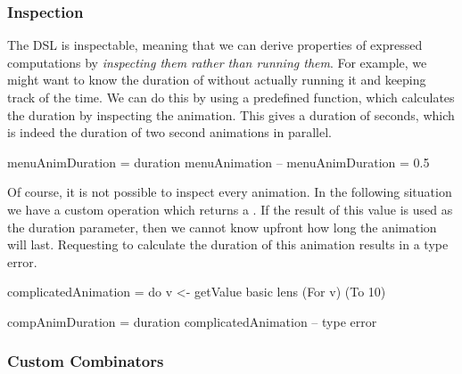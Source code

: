 


\subsubsection{Inspection}

The DSL is inspectable, meaning that we can derive properties of expressed computations by \emph{inspecting them rather than running them}. For example, we might want to know the duration of  without actually running it and keeping track of the time. We can do this by using a predefined  function, which calculates the duration by inspecting the animation. This gives a duration of  seconds, which is indeed the duration of two  second animations in parallel.

\begin{spec}
menuAnimDuration = duration menuAnimation
-- menuAnimDuration = 0.5 
\end{spec}

Of course, it is not possible to inspect every animation. In the following situation we have a custom operation  which returns a . If the result of this value is used as the duration parameter, then we cannot know upfront how long the animation will last. Requesting to calculate the duration of this animation results in a type error.

\begin{spec}
complicatedAnimation = do
  v <- getValue
  basic lens (For v) (To 10)

compAnimDuration = duration complicatedAnimation
-- type error
\end{spec}

\subsubsection{Custom Combinators}
\label{sec:customcomb}

